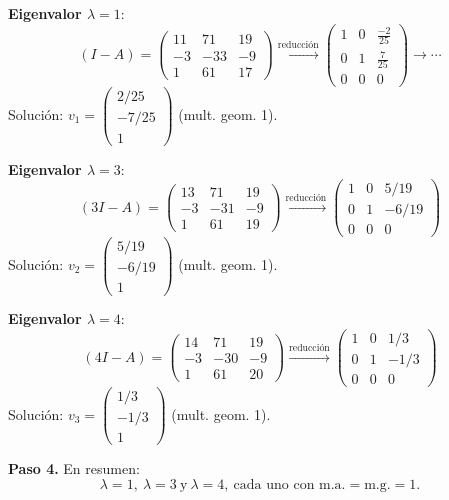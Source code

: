 \begin{example}
\begin{enumerate}[$a)$]
\begin{myproof}
\textbf{Eigenvalor $\lambda=1$}:
\[
(I - A) = \begin{pmatrix}
11 & 71 & 19 \\
-3 & -33 & -9 \\
1 & 61 & 17
\end{pmatrix} \xrightarrow{\text{reducción}} \begin{pmatrix}
1 & 0 & \frac{-2}{25} \\
0 & 1 & \frac{7}{25} \\
0 & 0& 0
\end{pmatrix} \to \cdots
\]
Solución: $v_1 = \begin{pmatrix} 2/25 \\ -7/25 \\ 1 \end{pmatrix}$ (mult. geom. 1).

\textbf{Eigenvalor $\lambda=3$}:
\[
(3I - A) = \begin{pmatrix}
13 & 71 & 19 \\
-3 & -31 & -9 \\
1 & 61 & 19
\end{pmatrix} \xrightarrow{\text{reducción}} \begin{pmatrix}
1 & 0 & 5/19 \\
0 & 1 & -6/19 \\
0 & 0 & 0
\end{pmatrix}
\]
Solución: $v_2 = \begin{pmatrix} 5/19 \\ -6/19 \\ 1 \end{pmatrix}$ (mult. geom. 1).

\textbf{Eigenvalor $\lambda=4$}:
\[
(4I - A) = \begin{pmatrix}
14 & 71 & 19 \\
-3 & -30 & -9 \\
1 & 61 & 20
\end{pmatrix} \xrightarrow{\text{reducción}} \begin{pmatrix}
1 & 0 & 1/3 \\
0 & 1 & -1/3 \\
0 & 0 & 0
\end{pmatrix}
\]
Solución: $v_3 = \begin{pmatrix} 1/3 \\ -1/3 \\ 1 \end{pmatrix}$ (mult. geom. 1).

\textbf{Paso 4.} En resumen:
\[
\boxed{\lambda=1,\ \lambda=3\ \text{y}\ \lambda=4,\ \text{cada uno con m.a.}=\text{m.g.}=1.}
\]
\end{myproof}


\end{enumerate}
\end{example}
